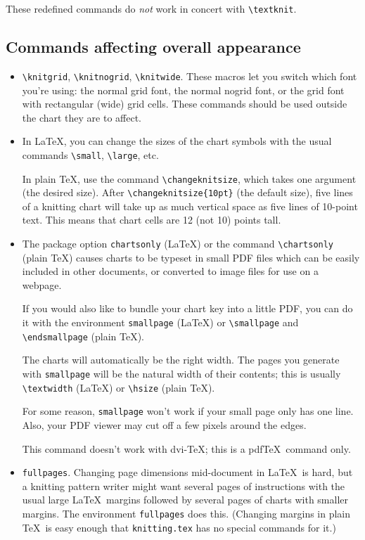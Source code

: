 \documentclass[draft]{amsart}
\begin{document}
These redefined commands do \emph{not} work in concert with \verb|\textknit|.

\subsection{Commands affecting overall appearance}

\begin{itemize}

\item \verb|\knitgrid|, \verb|\knitnogrid|, \verb|\knitwide|. These macros let you switch which font you're using: the normal grid font, the normal nogrid font, or the grid font with rectangular (wide) grid cells. These commands should be used outside the chart they are to affect.

\item In \LaTeX, you can change the sizes of the chart symbols with the usual commands \verb|\small|, \verb|\large|, etc. 

In plain \TeX, use the command \verb|\changeknitsize|, which takes one argument (the desired size). After \verb|\changeknitsize{10pt}| (the default size), five lines of a knitting chart will take up as much vertical space as five lines of 10-point text. This means that chart cells are 12 (not 10) points tall.

\item The package option \verb|chartsonly| (\LaTeX) or the command \verb|\chartsonly| (plain \TeX) causes charts to be typeset in small PDF files which can be easily included in other documents, or converted to image files for use on a webpage.

If you would also like to bundle your chart key into a little PDF, you can do it with the environment \verb|smallpage| (\LaTeX) or \verb|\smallpage| and \verb|\endsmallpage| (plain \TeX). 

The charts will automatically be the right width. The pages you generate with \verb|smallpage| will be the natural width of their contents; this is usually \verb|\textwidth| (\LaTeX) or \verb|\hsize| (plain \TeX).

For some reason, \verb|smallpage| won't work if your small page only has one line. Also, your PDF viewer may cut off a few pixels around the edges.

This command doesn't work with dvi-\TeX; this is a pdf\/\TeX\ command only.

\item \texttt{fullpages}. Changing page dimensions mid-document in \LaTeX\ is hard, but a knitting pattern writer might want several pages of instructions with the usual large \LaTeX\ margins followed by several pages of charts with smaller margins. The environment \texttt{fullpages} does this. (Changing margins in plain \TeX\ is easy enough that \texttt{knitting.tex} has no special commands for it.)

\end{itemize}
\end{document}
